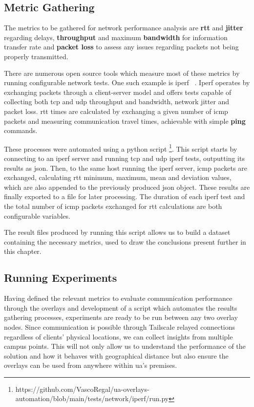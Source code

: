 \documentclass[11pt,twoside,a4paper]{report}
\begin{document}
\subsection{Metric Gathering}
\label{ss:metrics}

The metrics to be gathered for network performance analysis are \textbf{\ac{rtt}} and \textbf{jitter} regarding delays, \textbf{throughput} and maximum \textbf{bandwidth} for information transfer rate and \textbf{packet loss} to assess any issues regarding packets not being properly transmitted.

There are numerous open source tools which measure most of these metrics by running configurable network tests. One such example is iperf ~\cite{iperfws}. Iperf operates by exchanging packets through a client-server model and offers tests capable of collecting both \ac{tcp} and \ac{udp} throughput and bandwidth, network jitter and packet loss. \ac{rtt} times are calculated by exchanging a given number of \ac{icmp} packets and measuring communication travel times, achievable with simple \textbf{ping} commands.

These processes were automated using a python script \footnote{https://github.com/VascoRegal/ua-overlays-automation/blob/main/tests/network/iperf/run.py}. This script starts by connecting to an iperf server and running \ac{tcp} and \ac{udp} iperf tests, outputting its results as \ac{json}. Then, to the same host running the iperf server, \ac{icmp} packets are exchanged, calculating \ac{rtt} minimum, maximum, mean and deviation values, which are also appended to the previously produced \ac{json} object. These results are finally exported to a file for later processing. The duration of each iperf test and the total number of \ac{icmp} packets exchanged for \ac{rtt} calculations are both configurable variables.

The result files produced by running this script allows us to build a dataset containing the necessary metrics, used to draw the conclusions present further in this chapter.

\subsection{Running Experiments}

Having defined the relevant metrics to evaluate communication performance through the overlays and development of a script which automates the results gathering processes, experiments are ready to be run between any two overlay nodes. Since communication is possible through Tailscale relayed connections regardless of clients' physical locations, we can collect insights from multiple campus points. This will not only allow us to understand the performance of the solution and how it behaves with geographical distance but also ensure the overlays can be used from anywhere within \ac{ua}'s premises.
\end{document}

